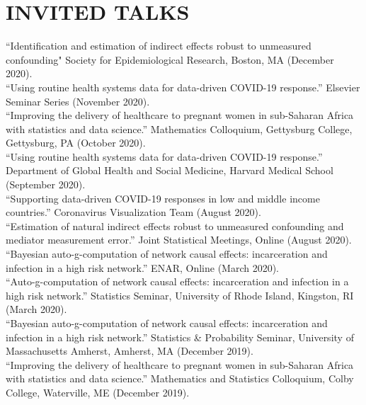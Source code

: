 \documentclass[12pt]{article}
\begin{document}
\section*{\textbf{{\large I}{NVITED} {\large T}{ALKS}}}   

``Identification and estimation of indirect effects robust to unmeasured confounding" Society for Epidemiological Research, Boston, MA (December 2020). \\

``Using routine health systems data for data-driven COVID-19 response.'' Elsevier Seminar Series (November 2020). \\

``Improving the delivery of healthcare to pregnant women in sub-Saharan Africa with statistics and data science.'' Mathematics Colloquium, Gettysburg College, Gettysburg, PA (October 2020). \\ 

``Using routine health systems data for data-driven COVID-19 response.'' Department of Global Health and Social Medicine, Harvard Medical School (September 2020). \\

``Supporting data-driven COVID-19 responses in low and middle income countries.'' Coronavirus Visualization Team (August 2020). \\

``Estimation of natural indirect effects robust to unmeasured confounding and mediator measurement error.'' Joint Statistical Meetings, Online (August 2020). \\

``Bayesian auto-g-computation of network causal effects: incarceration and infection in a high risk network.'' ENAR, Online (March 2020). \\

``Auto-g-computation of network causal effects: incarceration and infection in a high risk network.'' Statistics Seminar, University of Rhode Island, Kingston, RI (March 2020). \\

``Bayesian auto-g-computation of network causal effects: incarceration and infection in a high risk network.'' Statistics \& Probability Seminar, University of Massachusetts Amherst, Amherst, MA (December 2019). \\

``Improving the delivery of healthcare to pregnant women in sub-Saharan Africa with statistics and data science.'' Mathematics and Statistics Colloquium, Colby College, Waterville, ME (December 2019). \\ 
\end{document}
